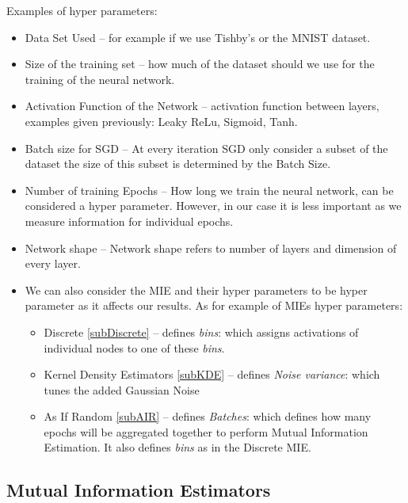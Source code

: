 \documentclass[dissertation.tex]{subfiles}
\begin{document}
Examples of hyper parameters:
\begin{itemize}
  \item{
      Data Set Used -- for example if we use Tishby's\cite{DATATISHBY}
      or the MNIST\cite{DATAMNIST} dataset.
    }
  \item{
      Size of the training set -- how much of the dataset should we use for the
      training of the neural network.
    }
  \item{
      Activation Function of the Network -- activation function between layers,
      examples given previously: Leaky ReLu, Sigmoid, Tanh.
    }
  \item{
      Batch size for SGD -- At every iteration SGD only consider a subset of the
      dataset the size of this subset is determined by the Batch Size.
    }
  \item{
      Number of training Epochs -- How long we train the neural network, can be
      considered a hyper parameter. However, in our case it is less important as
      we measure information for individual epochs.
    }
  \item{
      Network shape -- Network shape refers to number of layers and dimension of
      every layer. 
    }
  \item{
      We can also consider the MIE and their hyper parameters to be hyper
      parameter as it affects our results. As for example of MIEs hyper
      parameters: 
      \begin{itemize}
        \item{
            Discrete \autoref{subDiscrete} -- defines \emph{bins}: which assigns
            activations of individual nodes to one of these \emph{bins}.
          }
        \item{
            Kernel Density Estimators \autoref{subKDE} -- defines \emph{Noise
            variance}: which tunes the added Gaussian Noise
          }
        \item{
            As If Random \autoref{subAIR} -- defines \emph{Batches}: which defines how
            many epochs will be aggregated together to perform Mutual
            Information Estimation. It also defines \emph{bins} as in the
            Discrete MIE.
          }
      \end{itemize}
    }
\end{itemize}

\subsection{Mutual Information Estimators}
\label{subMIE}
\end{document}
